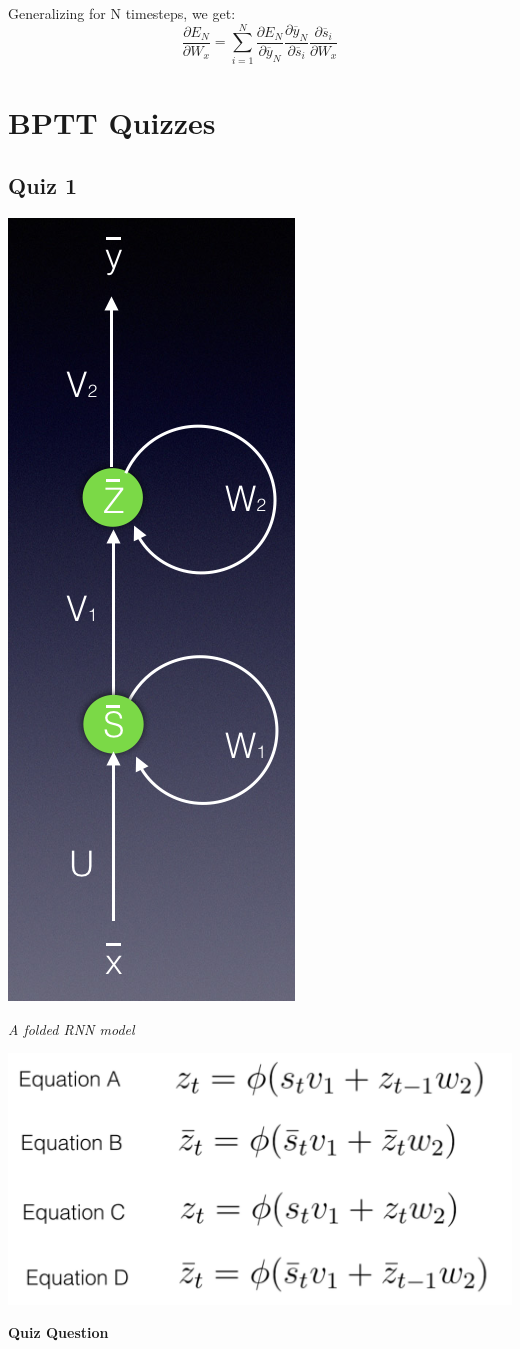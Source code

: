 Generalizing for N timesteps, we get: \[\frac{\partial E_N}{\partial W_x} = \sum_{i=1}^N \frac{\partial E_N}{\partial \overline{y}_N} \frac{\partial \overline{y}_N}{\partial \overline{s}_i} \frac{\partial \overline{s}_i}{\partial W_x}\] 

\section{BPTT Quizzes}

\subsection{Quiz 1}

\includegraphics[width=0.25\linewidth]{img//rnn//intro/screen-shot-2017-11-29-at-3.08.28-pm.png}

\textit{A folded RNN model} \newline

\includegraphics[width=0.5\linewidth]{img//rnn//intro/screen-shot-2017-11-29-at-5.33.53-pm.png}

\textbf{Quiz Question} \newline

